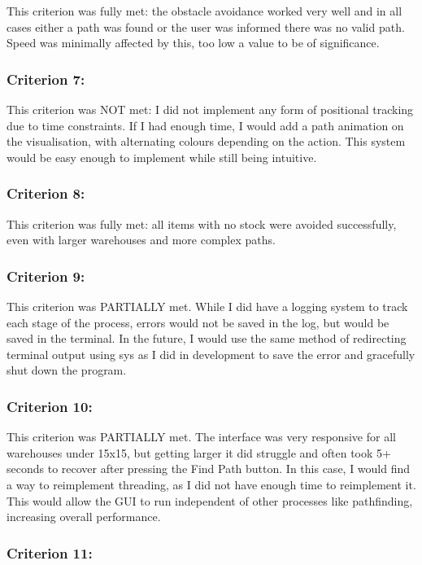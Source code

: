 This criterion was fully met: the obstacle avoidance worked very well and in all cases either a path was found or the user was informed there was no valid path. Speed was minimally affected by this, too low a value to be of significance.

\subsubsection{Criterion 7:}

This criterion was NOT met: I did not implement any form of positional tracking due to time constraints. If I had enough time, I would add a path animation on the visualisation, with alternating colours depending on the action. This system would be easy enough to implement while still being intuitive.

\subsubsection{Criterion 8:}
This criterion was fully met: all items with no stock were avoided successfully, even with larger warehouses and more complex paths.
\subsubsection{Criterion 9:}

This criterion was PARTIALLY met. While I did have a logging system to track each stage of the process, errors would not be saved in the log, but would be saved in the terminal. In the future, I would use the same method of redirecting terminal output using sys as I did in development to save the error and gracefully shut down the program.

\subsubsection{Criterion 10:}

This criterion was PARTIALLY met. The interface was very responsive for all warehouses under 15x15, but getting larger it did struggle and often took 5+ seconds to recover after pressing the Find Path button. In this case, I would find a way to reimplement threading, as I did not have enough time to reimplement it. This would allow the GUI to run independent of other processes like pathfinding, increasing overall performance.

\subsubsection{Criterion 11:}

